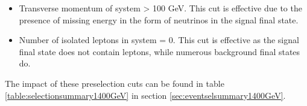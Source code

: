 \begin{itemize}
\item Transverse momentum of system > 100 GeV.  This cut is effective due to the presence of missing energy in the form of neutrinos in the signal final state.
\item Number of isolated leptons in system = 0.  This cut is effective as the signal final state does not contain leptons, while numerous background final states do.  
\end{itemize}

The impact of these preselection cuts can be found in table \ref{table:selectionsummary1400GeV} in section \ref{sec:eventselsummary1400GeV}.

\begin{figure}[h!]
\centering
{}
 \hfill
{}

\end{figure}
